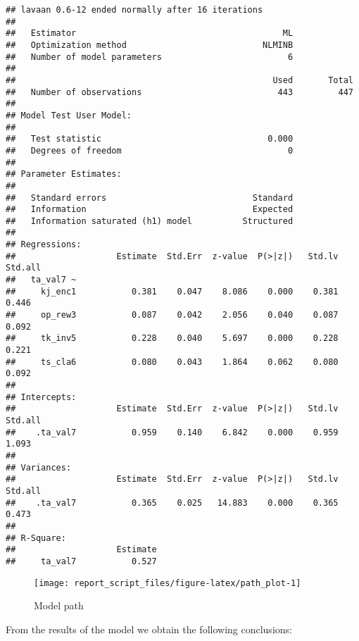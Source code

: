 \documentclass[
]{article}
\begin{document}
\begin{verbatim}
## lavaan 0.6-12 ended normally after 16 iterations
## 
##   Estimator                                         ML
##   Optimization method                           NLMINB
##   Number of model parameters                         6
## 
##                                                   Used       Total
##   Number of observations                           443         447
## 
## Model Test User Model:
##                                                       
##   Test statistic                                 0.000
##   Degrees of freedom                                 0
## 
## Parameter Estimates:
## 
##   Standard errors                             Standard
##   Information                                 Expected
##   Information saturated (h1) model          Structured
## 
## Regressions:
##                    Estimate  Std.Err  z-value  P(>|z|)   Std.lv  Std.all
##   ta_val7 ~                                                             
##     kj_enc1           0.381    0.047    8.086    0.000    0.381    0.446
##     op_rew3           0.087    0.042    2.056    0.040    0.087    0.092
##     tk_inv5           0.228    0.040    5.697    0.000    0.228    0.221
##     ts_cla6           0.080    0.043    1.864    0.062    0.080    0.092
## 
## Intercepts:
##                    Estimate  Std.Err  z-value  P(>|z|)   Std.lv  Std.all
##    .ta_val7           0.959    0.140    6.842    0.000    0.959    1.093
## 
## Variances:
##                    Estimate  Std.Err  z-value  P(>|z|)   Std.lv  Std.all
##    .ta_val7           0.365    0.025   14.883    0.000    0.365    0.473
## 
## R-Square:
##                    Estimate
##     ta_val7           0.527
\end{verbatim}

\begin{figure}

{\centering \texttt{[image: report\_script\_files/figure-latex/path\_plot-1]} 

}

\caption{Model path}\label{fig:path_plot}
\end{figure}

From the results of the model we obtain the following conclusions:
\end{document}
